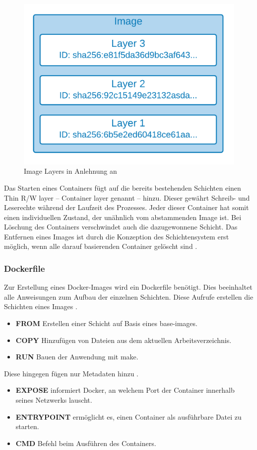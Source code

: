 \begin{figure}
    \centering
    \includegraphics[width=0.5\columnwidth]{images/Image-Layer.png}
    \caption{Image Layers in Anlehnung an \protect\cite[S.61]{dockerdeep}}
    \label{fig:dockerlayer}
\end{figure}


Das Starten eines Containers fügt auf die bereits bestehenden Schichten einen \glqq Thin R/W layer\grqq{} 
-- \glqq Container layer\grqq{} genannt -- hinzu. Dieser gewährt Schreib- und Leserechte während der Laufzeit des Prozesses. 
Jeder dieser Container hat somit einen individuellen Zustand, der unähnlich vom abstammenden Image ist.
Bei Löschung des Containers verschwindet auch die dazugewonnene Schicht.
Das Entfernen eines Images ist durch die Konzeption des Schichtensystem erst möglich, wenn alle darauf
basierenden Container gelöscht sind \cite{dockerstoragedriver}.

\subsubsection{Dockerfile}
Zur Erstellung eines Docker-Images wird ein Dockerfile benötigt. Dies beeinhaltet alle Anweisungen
zum Aufbau der einzelnen Schichten. 
Diese Aufrufe erstellen die Schichten eines Images \cite{dockerbestpracticedockerfile}.
\begin{itemize}
    \item \textbf{FROM} Erstellen einer Schicht auf Basis eines base-images. 
    \item \textbf{COPY} Hinzufügen von Dateien aus dem aktuellen Arbeitsverzeichnis. 
    \item \textbf{RUN} Bauen der Anwendung mit make. 
\end{itemize}
Diese hingegen fügen nur Metadaten hinzu \cite{dockerbestpracticedockerfile}.
\begin{itemize}
    \item \textbf{EXPOSE} informiert Docker, an welchem Port der Container innerhalb seines Netzwerks lauscht.
    \item \textbf{ENTRYPOINT} ermöglicht es, einen Container als ausführbare Datei zu starten.
    \item \textbf{CMD} Befehl beim Ausführen des Containers.
\end{itemize}


